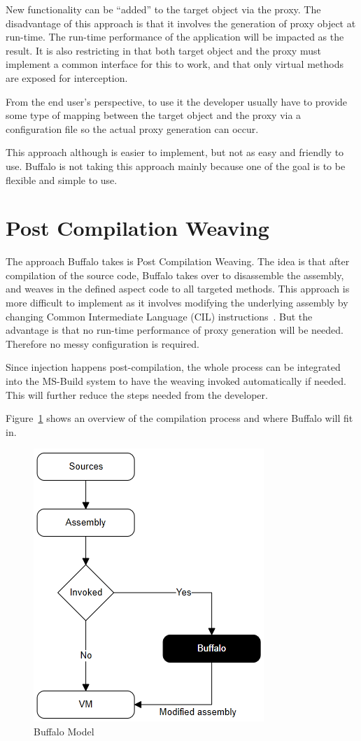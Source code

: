New functionality can be “added” to the target object via the proxy. The disadvantage of this approach is that it involves the generation of proxy object at run-time. The run-time performance of the application will be impacted as the result. It is also restricting in that both target object and the proxy must implement a common interface for this to work, and that only virtual methods are exposed for interception.

From the end user's perspective, to use it the developer usually have to provide some type of mapping between the target object and the proxy via a configuration file so the actual proxy generation can occur. 

This approach although is easier to implement, but not as easy and friendly to use. Buffalo is not taking this approach mainly because one of the goal is to be flexible and simple to use.

\section{Post Compilation Weaving}

The approach Buffalo takes is Post Compilation Weaving. The idea is that after compilation of the source code, Buffalo takes over to disassemble the assembly, and weaves in the defined aspect code to all targeted methods. This approach is more difficult to implement as it involves modifying the underlying assembly by changing Common Intermediate Language (CIL) instructions~\cite{rewrite_msil}. But the advantage is that no run-time performance of proxy generation will be needed. Therefore no messy configuration is required.

Since injection happens post-compilation, the whole process can be integrated into the MS-Build system to have the weaving invoked automatically if needed. This will further reduce the steps needed from the developer.

Figure~\ref{buffalo_model} shows an overview of the compilation process and where Buffalo will fit in.

\begin{figure}[H]
  \includegraphics[scale=1.0]{BuffaloOverview2.PNG}
  \centering
  \caption{Buffalo Model\label{buffalo_model}}
\end{figure}

